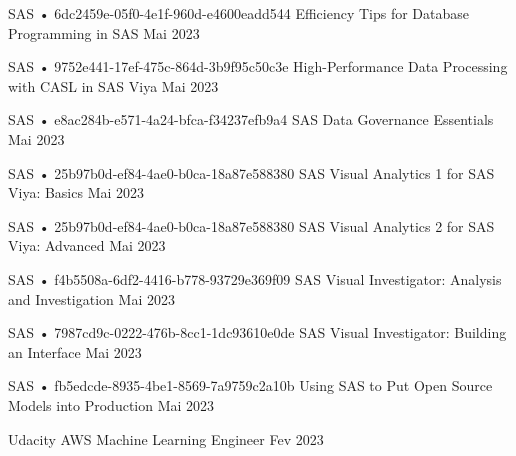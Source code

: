 \begin{cventries}
  \cventry
    {SAS • 6dc2459e-05f0-4e1f-960d-e4600eadd544} %
    {Efficiency Tips for Database Programming in SAS} %
    {} %
    {Mai 2023} %
    {}

  \cventry
    {SAS • 9752e441-17ef-475c-864d-3b9f95c50c3e} %
    {High-Performance Data Processing with CASL in SAS Viya} %
    {} %
    {Mai 2023} %
    {}

  \cventry
    {SAS • e8ac284b-e571-4a24-bfca-f34237efb9a4} %
    {SAS Data Governance Essentials} %
    {} %
    {Mai 2023} %
    {}

  \cventry
    {SAS • 25b97b0d-ef84-4ae0-b0ca-18a87e588380} %
    {SAS Visual Analytics 1 for SAS Viya: Basics} %
    {} %
    {Mai 2023} %
    {}

  \cventry
    {SAS • 25b97b0d-ef84-4ae0-b0ca-18a87e588380} %
    {SAS Visual Analytics 2 for SAS Viya: Advanced} %
    {} %
    {Mai 2023} %
    {}

  \cventry
    {SAS • f4b5508a-6df2-4416-b778-93729e369f09} %
    {SAS Visual Investigator: Analysis and Investigation} %
    {} %
    {Mai 2023} %
    {}

  \cventry
    {SAS • 7987cd9c-0222-476b-8cc1-1dc93610e0de} %
    {SAS Visual Investigator: Building an Interface} %
    {} %
    {Mai 2023} %
    {}

  \cventry
    {SAS • fb5edcde-8935-4be1-8569-7a9759c2a10b} %
    {Using SAS to Put Open Source Models into Production} %
    {} %
    {Mai 2023} %
    {}

  \cventry
    {Udacity} %
    {AWS Machine Learning Engineer} %
    {} %
    {Fev 2023} %
    {}


\end{cventries}
